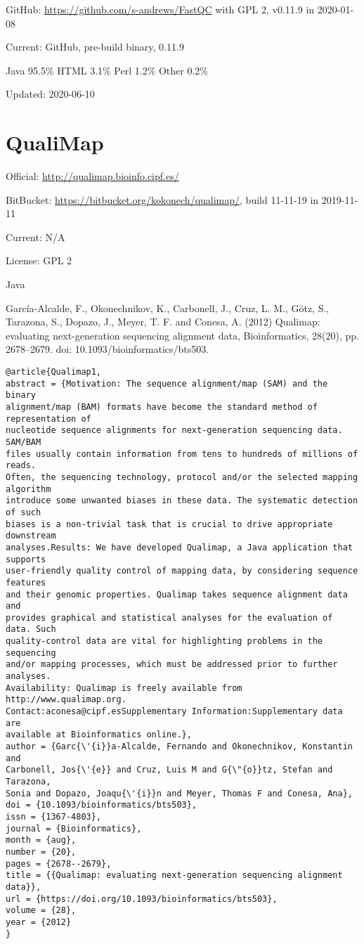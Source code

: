 \documentclass[]{article}
\begin{document}
GitHub: \url{https://github.com/s-andrews/FastQC} with GPL 2, v0.11.9 in 2020-01-08

Current: GitHub, pre-build binary, 0.11.9

Java 95.5\% HTML 3.1\% Perl 1.2\% Other 0.2\%

Updated: 2020-06-10

\section{QualiMap}

Official: \url{http://qualimap.bioinfo.cipf.es/}

BitBucket: \url{https://bitbucket.org/kokonech/qualimap/}, build 11-11-19 in 2019-11-11

Current: N/A

License: GPL 2

Java

García-Alcalde, F., Okonechnikov, K., Carbonell, J., Cruz, L. M., Götz, S., Tarazona, S., Dopazo, J., Meyer, T. F. and Conesa, A. (2012) Qualimap: evaluating next-generation sequencing alignment data, Bioinformatics, 28(20), pp. 2678–2679. doi: 10.1093/bioinformatics/bts503.

\begin{verbatim}
@article{Qualimap1,
abstract = {Motivation: The sequence alignment/map (SAM) and the binary
alignment/map (BAM) formats have become the standard method of representation of
nucleotide sequence alignments for next-generation sequencing data. SAM/BAM
files usually contain information from tens to hundreds of millions of reads.
Often, the sequencing technology, protocol and/or the selected mapping algorithm
introduce some unwanted biases in these data. The systematic detection of such
biases is a non-trivial task that is crucial to drive appropriate downstream
analyses.Results: We have developed Qualimap, a Java application that supports
user-friendly quality control of mapping data, by considering sequence features
and their genomic properties. Qualimap takes sequence alignment data and
provides graphical and statistical analyses for the evaluation of data. Such
quality-control data are vital for highlighting problems in the sequencing
and/or mapping processes, which must be addressed prior to further analyses.
Availability: Qualimap is freely available from http://www.qualimap.org.
Contact:aconesa@cipf.esSupplementary Information:Supplementary data are
available at Bioinformatics online.},
author = {Garc{\'{i}}a-Alcalde, Fernando and Okonechnikov, Konstantin and
Carbonell, Jos{\'{e}} and Cruz, Luis M and G{\"{o}}tz, Stefan and Tarazona,
Sonia and Dopazo, Joaqu{\'{i}}n and Meyer, Thomas F and Conesa, Ana},
doi = {10.1093/bioinformatics/bts503},
issn = {1367-4803},
journal = {Bioinformatics},
month = {aug},
number = {20},
pages = {2678--2679},
title = {{Qualimap: evaluating next-generation sequencing alignment data}},
url = {https://doi.org/10.1093/bioinformatics/bts503},
volume = {28},
year = {2012}
}
\end{verbatim}
\end{document}
